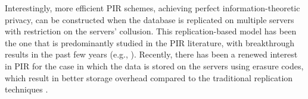 \documentclass[letterpaper, 10 pt, conference]{ieeeconf}
\newcommand\alexn[1]{\notee[alex]{#1}}
\begin{document}
Interestingly, more efficient PIR schemes, achieving perfect  information-theoretic privacy,  can be constructed when the database is replicated on multiple servers with restriction on the servers' collusion.
 This replication-based model  has been the one that is predominantly studied in the PIR literature, with  breakthrough results in the past few years 
 (e.g., \cite{sun2016capacitynoncol, sun2016capacity, yekhanin2010private, beimel2001information, beimel2002breaking,gasarch2004survey}). 
Recently, there has been a renewed  interest in  PIR for the case in which the data is  stored on the servers using erasure codes, which result in  better storage overhead compared to the traditional replication techniques \cite{shah2014one, chan2014private, tajeddine2016private, extended, banawan2016capacity, fazeli2015pir, blackburn2016pir, freij2016private}. 







%



%
\end{document}
